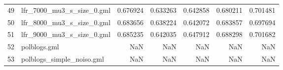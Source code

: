 \begin{tabular}{llrrrrr}
49 &   lfr\_7000\_mu3\_s\_size\_0.gml &                          0.676924 &                             0.633263 &                            0.642858 &                           0.680211 &                        0.701481 \\
50 &   lfr\_8000\_mu3\_s\_size\_0.gml &                          0.683656 &                             0.638224 &                            0.642072 &                           0.683857 &                        0.697694 \\
51 &   lfr\_9000\_mu3\_s\_size\_0.gml &                          0.685235 &                             0.642035 &                            0.647912 &                           0.688298 &                        0.701682 \\
52 &                polblogs.gml &                               NaN &                                  NaN &                                 NaN &                                NaN &                             NaN \\
53 &   polblogs\_simple\_noiso.gml &                               NaN &                                  NaN &                                 NaN &                                NaN &                             NaN \\
\bottomrule
\end{tabular}
